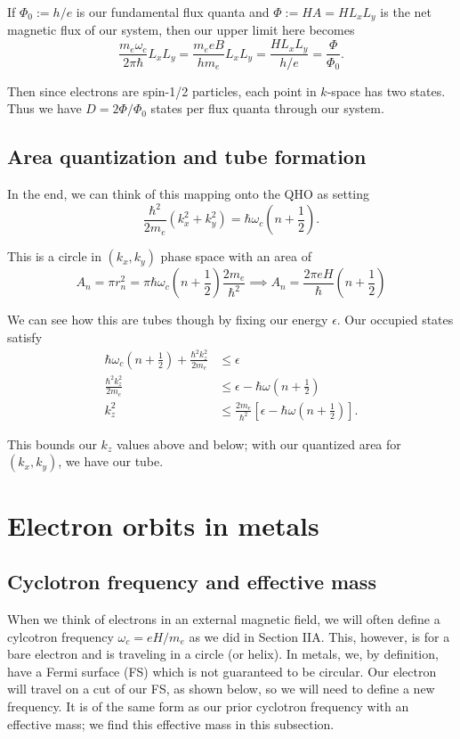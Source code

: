 \documentclass[12pt]{revtex4-2}
\begin{document}
If $\Phi_0 := h/e$ is our fundamental flux quanta and $\Phi := HA = HL_xL_y$ is the net magnetic flux of our system, then our upper limit here becomes
\begin{equation}
    \frac{m_e\omega_c}{2\pi\hbar}L_xL_y = \frac{m_eeB}{hm_e}L_xL_y = \frac{HL_xL_y}{h/e} = \frac{\Phi}{\Phi_0}.
\end{equation}

Then since electrons are spin-1/2 particles, each point in $k$-space has two states.  Thus we have $\boxed{ D = 2\Phi/\Phi_0 }$ states per flux quanta through our system.

\subsection{Area quantization and tube formation}
In the end, we can think of this mapping onto the QHO as setting
\begin{equation}\label{eqn:area_start}
    \frac{\hbar^2}{2m_e}(k_x^2 + k_y^2) = \hbar\omega_c\left( n + \frac{1}{2} \right).
\end{equation}

This is a circle in $(k_x,k_y)$ phase space with an area of
\begin{equation}
    A_n = \pi r_n^2 = \pi\hbar\omega_c\left( n + \frac{1}{2} \right)\frac{2m_e}{\hbar^2} \implies \boxed{ A_n = \frac{2\pi eH}{\hbar}\left( n + \frac{1}{2} \right)}\label{eqn:area-n}
\end{equation}

We can see how this are tubes though by fixing our energy $\epsilon$.  Our occupied states satisfy
\begin{align}
    \hbar\omega_c\left( n + \frac{1}{2} \right) + \frac{\hbar^2 k_z^2}{2m_e} &\leq \epsilon \\
    \frac{\hbar^2 k_z^2}{2m_e} &\leq \epsilon - \hbar\omega\left( n + \frac{1}{2} \right) \\
    k_z^2 &\leq \frac{2m_e}{\hbar^2}\left[ \epsilon - \hbar\omega\left( n + \frac{1}{2} \right) \right].
\end{align}

This bounds our $k_z$ values above and below; with our quantized area for $(k_x,k_y)$, we have our tube.

\newpage
\section{Electron orbits in metals}
\subsection{Cyclotron frequency and effective mass}
When we think of electrons in an external magnetic field, we will often define a cylcotron frequency $\omega_c = eH/m_e$ as we did in Section IIA.  This, however, is for a bare electron and is traveling in a circle (or helix).  In metals, we, by definition, have a Fermi surface (FS) which is not guaranteed to be circular.  Our electron will travel on a cut of our FS, as shown below, so we will need to define a new frequency.  It is of the same form as our prior cyclotron frequency with an effective mass; we find this effective mass in this subsection.
\par
\end{document}
